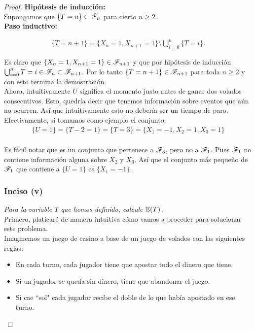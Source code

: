 \begin{proof}
		\textbf{Hipótesis de inducción:}\\
		
			Supongamos que $\{T = n\} \in \mathscr{F}_n$ para cierto $n \geq 2$.\\
			
		\textbf{Paso inductivo:}
			
			\begin{align}
				\{T = n + 1 \} = \{ X_n = 1, X_{n+1} = 1\} \setminus \bigcup_{i=0}^{n} \{T = i\}.
			\end{align}				
		
			Es claro que $\{ X_n = 1, X_{n+1} = 1\} \in \mathscr{F}_{n + 1}$ y que por hipótesis de inducción
			$\bigcup_{i=0}^{n} {T = i} \in \mathscr{F}_n \subset \mathscr{F}_{n + 1}$. Por lo tanto
			$\{T = n + 1 \} \in \mathscr{F}_{n+1}$ para toda $n \geq 2$ y con esto termina la demostración.\\
			
		Ahora, intuitivamente $U$ significa el momento justo antes de ganar dos volados consecutivos.
		Esto, quedría decir que tenemos información sobre eventos que aún no ocurren. Así que intuitivamente
		esto no debería ser un tiempo de paro.\\
		
		Efectivamente, si tomamos como ejemplo el conjunto: 
			\begin{align}
				\{ U = 1 \} = \{ T - 2 = 1\} = \{ T = 3\} = \{X_1 = -1, X_2 = 1, X_3 = 1\}
			\end{align}		\\
				
		Es fácil notar que es un conjunto que pertenece a $\mathscr{F}_3$, pero no a $\mathscr{F}_1$. Pues $\mathscr{F}_1$
		no contiene información alguna sobre $X_2$ y $X_3$. Así que el conjunto más pequeño de $\mathscr{F}_1$ 
		que contiene a $\{ U = 1 \}$ es $\{ X_1 = -1 \}$.\\
	
	\subsubsection{Inciso (v)}	
	\emph
	{
		Para la variable $T$ que hemos definido, calcule $\mathbb{E}\! \left( T \right)$.\\
	}
		Primero, platicaré de manera intuitiva cómo vamos a proceder para solucionar este problema.\\
	
		Imaginemos un juego de casino a base de un juego de volados con las siguientes reglas:\\
		\begin{itemize}
				\item En cada turno, cada jugador tiene que apostar todo el dinero que tiene.
				\item Si un jugador se queda sin dinero, tiene que abandonar el juego.
				\item Si cae ``sol" cada jugador recibe el doble de lo que había apostado en ese turno.  
		\end{itemize}
	   

\end{proof}
